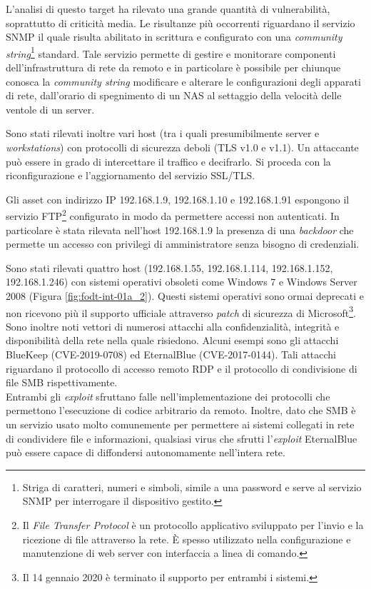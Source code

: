 \documentclass[target=bach,aauheader=]{thud}
\begin{document}
L’analisi di questo target ha rilevato una grande quantità di vulnerabilità, soprattutto di criticità media.
Le risultanze più occorrenti riguardano il servizio SNMP il quale risulta abilitato in scrittura e configurato con una \textit{community string}\footnote{Striga di caratteri, numeri e simboli, simile a una password e serve al servizio SNMP per interrogare il dispositivo gestito.} standard. Tale servizio permette di gestire e monitorare componenti dell’infrastruttura di rete da remoto e in particolare è possibile per chiunque conosca la \textit{community string} modificare e alterare le configurazioni degli apparati di rete, dall'orario di spegnimento di un NAS al settaggio della velocità delle ventole di un server.

Sono stati rilevati inoltre vari host (tra i quali presumibilmente server e \textit{workstations}) con protocolli di sicurezza deboli (TLS v1.0 e v1.1). Un attaccante può essere in grado di intercettare il traffico e decifrarlo. Si proceda con la riconfigurazione e l’aggiornamento del servizio SSL/TLS.

Gli asset con indirizzo IP 192.168.1.9, 192.168.1.10 e 192.168.1.91 espongono il servizio FTP\footnote{Il \textit{File Transfer Protocol} è un protocollo applicativo sviluppato per l'invio e la ricezione di file attraverso la rete. È spesso utilizzato nella configurazione e manutenzione di web server con interfaccia a linea di comando.} configurato in modo da permettere accessi non autenticati. In particolare è stata rilevata nell'host 192.168.1.9 la presenza di una \textit{backdoor} che permette un accesso con privilegi di amministratore senza bisogno di credenziali.

Sono stati rilevati quattro host (192.168.1.55, 192.168.1.114, 192.168.1.152, 192.168.1.246) con sistemi operativi obsoleti come Windows 7 e Windows Server 2008  (Figura \ref{fig:fodt-int-01a_2}). Questi sistemi operativi sono ormai deprecati e non ricevono più il supporto ufficiale attraverso \textit{patch} di sicurezza di Microsoft\footnote{Il 14 gennaio 2020 è terminato il supporto per entrambi i sistemi.}. Sono inoltre noti vettori di numerosi attacchi alla confidenzialità, integrità e disponibilità della rete nella quale risiedono. Alcuni esempi sono gli attacchi BlueKeep (CVE-2019-0708) ed EternalBlue (CVE-2017-0144). Tali attacchi riguardano il protocollo di accesso remoto RDP e il protocollo di condivisione di file SMB rispettivamente.
\\ Entrambi gli \textit{exploit} sfruttano falle nell'implementazione dei protocolli che permettono l'esecuzione di codice arbitrario da remoto. Inoltre, dato che SMB è un servizio usato molto comunemente per permettere ai sistemi collegati in rete di condividere file e informazioni, qualsiasi virus che sfrutti l'\textit{exploit} EternalBlue può essere capace di diffondersi autonomamente nell'intera rete.  
\end{document}

